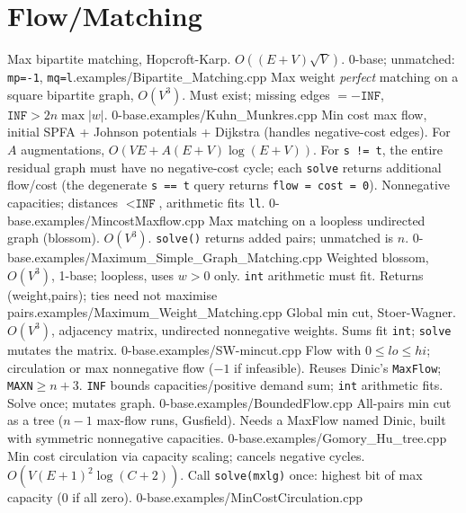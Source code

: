 \section{Flow/Matching}
%
{Max bipartite matching, Hopcroft-Karp. $O((E+V)\sqrt V)$. 0-base; unmatched: \texttt{mp=-1}, \texttt{mq=l}.}{examples/Bipartite_Matching.cpp}
%
{Max weight \emph{perfect} matching on a square bipartite graph, $O(V^3)$. Must exist; missing edges $=-\texttt{INF}$, $\texttt{INF}>2n\max|w|$. 0-base.}{examples/Kuhn_Munkres.cpp}
%
{Min cost max flow, initial SPFA + Johnson potentials + Dijkstra (handles negative-cost edges). For $A$ augmentations, $O(VE+A(E+V)\log(E+V))$. For \texttt{s != t}, the entire residual graph must have no negative-cost cycle; each \texttt{solve} returns additional flow/cost (the degenerate \texttt{s == t} query returns \texttt{flow = cost = 0}). Nonnegative capacities; distances $<\texttt{INF}$, arithmetic fits \texttt{ll}. 0-base.}{examples/MincostMaxflow.cpp}
%
{Max matching on a loopless undirected graph (blossom). $O(V^3)$. \texttt{solve()} returns added pairs; unmatched is $n$. 0-base.}{examples/Maximum_Simple_Graph_Matching.cpp}
%
{Weighted blossom, $O(V^3)$, 1-base; loopless, uses $w>0$ only. \texttt{int} arithmetic must fit. Returns (weight,pairs); ties need not maximise pairs.}{examples/Maximum_Weight_Matching.cpp}
%
{Global min cut, Stoer-Wagner. $O(V^3)$, adjacency matrix, undirected nonnegative weights. Sums fit \texttt{int}; \texttt{solve} mutates the matrix. 0-base.}{examples/SW-mincut.cpp}
%
{Flow with $0\le lo\le hi$; circulation or max nonnegative flow ($-1$ if infeasible). Reuses Dinic's \texttt{MaxFlow}; \texttt{MAXN}$\ge n+3$. \texttt{INF} bounds capacities/positive demand sum; \texttt{int} arithmetic fits. Solve once; mutates graph. 0-base.}{examples/BoundedFlow.cpp}
%
{All-pairs min cut as a tree ($n-1$ max-flow runs, Gusfield). Needs a MaxFlow named Dinic, built with symmetric nonnegative capacities. 0-base.}{examples/Gomory_Hu_tree.cpp}
%
{Min cost circulation via capacity scaling; cancels negative cycles. $O(V(E+1)^2\log(C+2))$. Call \texttt{solve(mxlg)} once: highest bit of max capacity (0 if all zero). 0-base.}{examples/MinCostCirculation.cpp}
